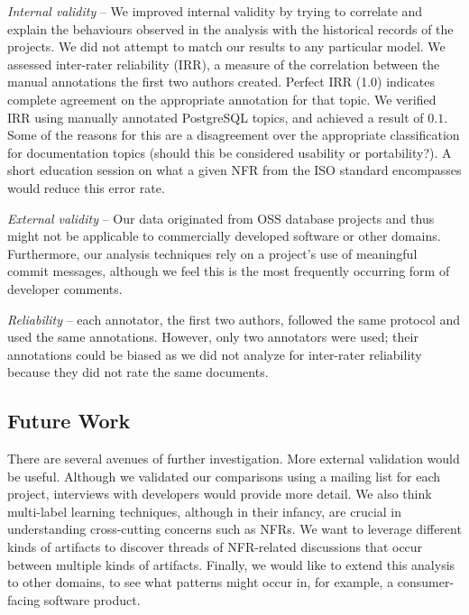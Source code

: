 \documentclass[smallextended]{svjour3}       %
\begin{document}
\emph{Internal validity} -- %
We improved internal validity by trying to correlate and explain the behaviours observed in the analysis with the historical records of the projects.
We did not attempt to match our results to any particular model.
We assessed inter-rater reliability (IRR), a measure of the correlation between the manual annotations the first two authors created. Perfect IRR (1.0) indicates complete agreement 
on the appropriate annotation for that topic. We verified IRR using
manually annotated PostgreSQL topics, and achieved a result of $0.1$.
Some of the reasons for this are a disagreement over the appropriate classification for documentation topics (should this be considered
usability or portability?). A short education session on what a given NFR from the ISO standard encompasses would reduce this error rate.

\emph{External validity} -- %
Our data originated from OSS database projects and thus might not be applicable to commercially developed software or other domains. 
Furthermore, our analysis techniques rely on a project's use of meaningful commit messages, although we feel this is the most frequently occurring form
of developer comments. 


\emph{Reliability} -- each annotator, the first two authors, followed the same protocol and used the same annotations. 
However, only two annotators were used; their annotations could be
biased as we did not analyze for inter-rater reliability because they
did not rate the same documents.

\subsection{Future Work}
There are several avenues of further investigation.  
More external validation would be useful. 
Although we validated our comparisons using a mailing list for each project, interviews with developers would provide more detail. 
We also think multi-label learning techniques, although in their infancy, are crucial in understanding cross-cutting concerns such as NFRs. 
We want to leverage different kinds of artifacts to discover threads of NFR-related discussions that occur between multiple kinds of artifacts.
Finally, we would like to extend this analysis to other domains, to see what patterns might occur in, for example, a consumer-facing software product.
\end{document}
